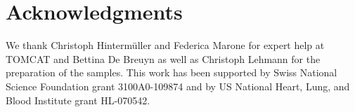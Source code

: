 \section{Acknowledgments}
We thank Christoph Hinterm\"uller and Federica Marone for expert help at \ac{TOMCAT} and Bettina De Breuyn as well as Christoph Lehmann for the preparation of the samples. This work has been supported by Swiss National Science Foundation grant 3100A0-109874 and by US National Heart, Lung, and Blood Institute grant HL-070542.
%
%